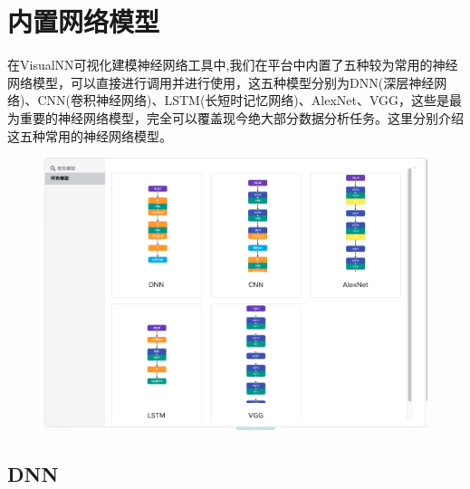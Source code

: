 \documentclass{progbookcn}
\begin{document}
\chapter{内置网络模型}

在VisualNN可视化建模神经网络工具中,我们在平台中内置了五种较为常用的神经网络模型，可以直接进行调用并进行使用，这五种模型分别为DNN(深层神经网络)、CNN(卷积神经网络)、LSTM(长短时记忆网络)、AlexNet、VGG，这些是最为重要的神经网络模型，完全可以覆盖现今绝大部分数据分析任务。这里分别介绍这五种常用的神经网络模型。


\begin{figure}[H]
  \centering
  \includegraphics[width=0.98\linewidth]{model.png}
\end{figure}


\section{DNN}
\end{document}
